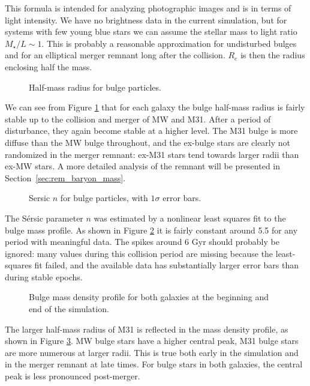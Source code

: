 \documentclass[twocolumn]{aastex63}
\begin{document}
This formula is intended for analyzing photographic images and is in terms of light intensity. We have no brightness data in the current simulation, but for systems with few young blue stars we can assume the stellar mass to light ratio $M_\star/L \sim 1$. This is probably a reasonable approximation for undisturbed bulges and for an elliptical merger remnant long after the collision. $R_e$ is then the radius enclosing half the mass.

\begin{figure}[bht!]
	\caption{Half-mass radius for bulge particles.
		\label{fig:sersic_Re}}
\end{figure}

We can see from Figure \ref{fig:sersic_Re} that for each galaxy the bulge half-mass radius is fairly stable up to the collision and merger of MW and M31. After a period of disturbance, they again become stable at a higher level. The M31 bulge is more diffuse than the MW bulge throughout, and the ex-bulge stars are clearly not randomized in the merger remnant: ex-M31 stars tend towards larger radii than ex-MW stars. A more detailed analysis of the remnant will be presented in Section~\ref{sec:rem_baryon_mass}.

\begin{figure}[bht!]
	\caption{Sersic $n$ for bulge particles, with $1\sigma$ error bars.
		\label{fig:sersic_n}}
\end{figure}

The Sérsic parameter $n$ was estimated by a nonlinear least squares fit to the bulge mass profile. As shown in Figure \ref{fig:sersic_n} it is fairly constant around 5.5 for any period with meaningful data. The spikes around 6 Gyr should probably be ignored: many values during this collision period are missing because the least-squares fit failed, and the available data has substantially larger error bars than during stable epochs.

\begin{figure}[bht!]
	\caption{Bulge mass density profile for both galaxies at the beginning and end of the simulation.
		\label{fig:bulge_mp}}
\end{figure}

The larger half-mass radius of M31 is reflected in the mass density profile, as shown in Figure \ref{fig:bulge_mp}. MW bulge stars have a higher central peak, M31 bulge stars are more numerous at larger radii. This is true both early in the simulation and in the merger remnant at late times. For bulge stars in both galaxies, the central peak is less pronounced post-merger.
\end{document}
